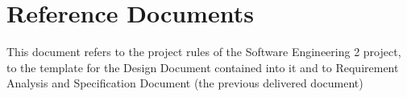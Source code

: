 \section{Reference Documents}
This document refers to the project rules of the Software Engineering 2
project, to the template for the Design Document contained into it and to Requirement Analysis and Specification Document (the previous delivered document)
